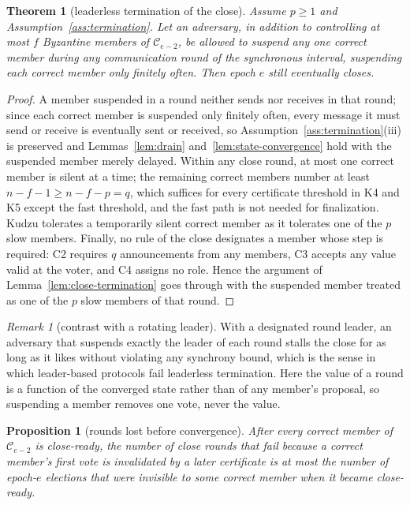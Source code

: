 \documentclass[11pt]{article}
\newtheorem{theorem}{Theorem}
\newtheorem{proposition}{Proposition}
\theoremstyle{remark}
\newtheorem{remark}{Remark}
\newcommand{\C}{\mathcal{C}}
\begin{document}
\begin{theorem}[leaderless termination of the close]
\label{thm:leaderless}
Assume $p\ge 1$ and Assumption~\ref{ass:termination}. Let an adversary, in addition to controlling at most $f$ Byzantine members of $\C_{e-2}$, be allowed to suspend any one correct member during any communication round of the synchronous interval, suspending each correct member only finitely often. Then epoch $e$ still eventually closes.
\end{theorem}

\begin{proof}
A member suspended in a round neither sends nor receives in that round; since each correct member is suspended only finitely often, every message it must send or receive is eventually sent or received, so Assumption~\ref{ass:termination}(iii) is preserved and Lemmas~\ref{lem:drain} and~\ref{lem:state-convergence} hold with the suspended member merely delayed. Within any close round, at most one correct member is silent at a time; the remaining correct members number at least $n-f-1\ge n-f-p=q$, which suffices for every certificate threshold in K4 and K5 except the fast threshold, and the fast path is not needed for finalization. Kudzu tolerates a temporarily silent correct member as it tolerates one of the $p$ slow members. Finally, no rule of the close designates a member whose step is required: C2 requires $q$ announcements from any members, C3 accepts any value valid at the voter, and C4 assigns no role. Hence the argument of Lemma~\ref{lem:close-termination} goes through with the suspended member treated as one of the $p$ slow members of that round.
\end{proof}

\begin{remark}[contrast with a rotating leader]
With a designated round leader, an adversary that suspends exactly the leader of each round stalls the close for as long as it likes without violating any synchrony bound, which is the sense in which leader-based protocols fail leaderless termination. Here the value of a round is a function of the converged state rather than of any member's proposal, so suspending a member removes one vote, never the value.
\end{remark}

\begin{proposition}[rounds lost before convergence]
\label{prop:lost-rounds}
After every correct member of $\C_{e-2}$ is close-ready, the number of close rounds that fail because a correct member's first vote is invalidated by a later certificate is at most the number of epoch-$e$ elections that were invisible to some correct member when it became close-ready.
\end{proposition}
\end{document}
